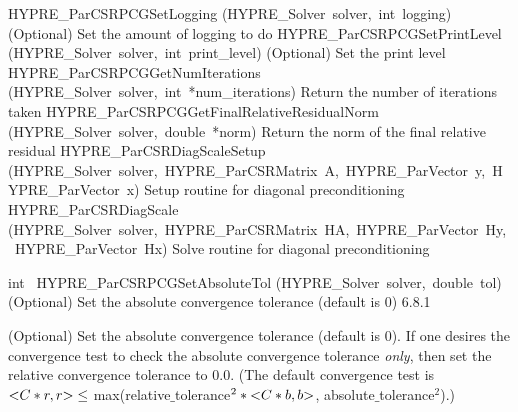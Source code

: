 \documentclass{article}
\begin{document}
\begin{cxxentry}
\begin{cxxentry}
\begin{cxxnames}
        {HYPRE\_ParCSRPCGSetLogging}
        {(HYPRE\_Solver\ solver,\ int\ logging)}
        {
(Optional) Set the amount of logging to do}
        {}
\label{cxx.6.8.12}
        {HYPRE\_ParCSRPCGSetPrintLevel}
        {(HYPRE\_Solver\ solver,\ int\ print\_level)}
        {
(Optional) Set the print level}
        {}
\label{cxx.6.8.13}
        {HYPRE\_ParCSRPCGGetNumIterations}
        {(HYPRE\_Solver\ solver,\ int\ *num\_iterations)}
        {
Return the number of iterations taken}
        {}
\label{cxx.6.8.14}
        {HYPRE\_ParCSRPCGGetFinalRelativeResidualNorm}
        {(HYPRE\_Solver\ solver,\ double\ *norm)}
        {
Return the norm of the final relative residual}
        {}
\label{cxx.6.8.15}
        {HYPRE\_ParCSRDiagScaleSetup}
        {(HYPRE\_Solver\ solver,\ HYPRE\_ParCSRMatrix\ A,\ HYPRE\_ParVector\ y,\ HYPRE\_ParVector\ x)}
        {
Setup routine for diagonal preconditioning}
        {}
\label{cxx.6.8.16}
        {HYPRE\_ParCSRDiagScale}
        {(HYPRE\_Solver\ solver,\ HYPRE\_ParCSRMatrix\ HA,\ HYPRE\_ParVector\ Hy,\ HYPRE\_ParVector\ Hx)}
        {
Solve routine for diagonal preconditioning}
        {}
\label{cxx.6.8.17}
\end{cxxnames}
\begin{cxxfunction}
{int\ }
        {HYPRE\_ParCSRPCGSetAbsoluteTol}
        {(HYPRE\_Solver\ solver,\ double\ tol)}
        {
(Optional) Set the absolute convergence tolerance (default is
0)}
        {6.8.1}
\begin{cxxdoc}

(Optional) Set the absolute convergence tolerance (default is
0). If one desires the convergence test to check the absolute
convergence tolerance {\it only}, then set the relative convergence
tolerance to 0.0.  (The default convergence test is $ {\tt <}C*r,r{\tt >} \leq$
max(relative$\_$tolerance$^{2} \ast {\tt <}C*b, b{\tt >}$, absolute$\_$tolerance$^2$).)



\end{cxxdoc}
\end{cxxfunction}
\end{cxxentry}
\end{cxxentry}
\end{document}

